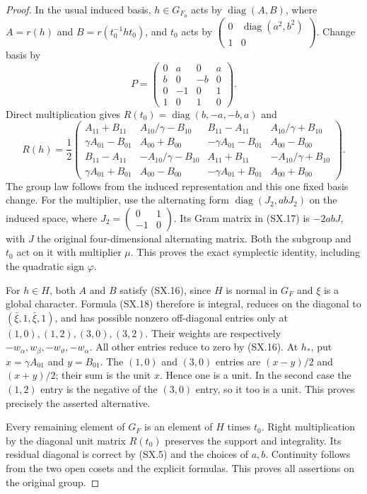 \begin{proof}
In the usual induced basis, $h\in G_{F_0}$ acts by
$\operatorname{diag}(A,B)$, where
$A=r(h)$ and $B=r(t_0^{-1}ht_0)$, and $t_0$ acts by
$\left(\begin{smallmatrix}0&\operatorname{diag}(a^2,b^2)\\1&0\end{smallmatrix}\right)$.
Change basis by
\[
 P=\begin{pmatrix}
 0&a&0&a\\ b&0&-b&0\\0&-1&0&1\\1&0&1&0
 \end{pmatrix}.
                                                            \tag{SX.17}
\]
Direct multiplication gives $R(t_0)=\operatorname{diag}(b,-a,-b,a)$
and
\[
R(h)=\frac12\begin{pmatrix}
A_{11}+B_{11}&A_{10}/\gamma-B_{10}&B_{11}-A_{11}&A_{10}/\gamma+B_{10}\\
\gamma A_{01}-B_{01}&A_{00}+B_{00}&-\gamma A_{01}-B_{01}&A_{00}-B_{00}\\
B_{11}-A_{11}&-A_{10}/\gamma-B_{10}&A_{11}+B_{11}&-A_{10}/\gamma+B_{10}\\
\gamma A_{01}+B_{01}&A_{00}-B_{00}&-\gamma A_{01}+B_{01}&A_{00}+B_{00}
\end{pmatrix}.                                                \tag{SX.18}
\]
The group law follows from the induced representation and this
one fixed basis change.  For the multiplier, use the alternating
form $\operatorname{diag}(J_2,abJ_2)$ on the induced space, where
$J_2=\left(\begin{smallmatrix}0&1\\-1&0\end{smallmatrix}\right)$.
Its Gram matrix in (SX.17) is $-2abJ$, with $J$ the original
four-dimensional alternating matrix.  Both the subgroup and
$t_0$ act on it with multiplier $\mu$.  This proves the exact
symplectic identity, including the quadratic sign $\varphi$.

For $h\in H$, both $A$ and $B$ satisfy (SX.16), since $H$ is
normal in $G_F$ and $\xi$ is a global character.  Formula (SX.18)
therefore is integral, reduces on the diagonal to
$(\bar\xi,1,\bar\xi,1)$, and has possible nonzero off-diagonal
entries only at $(1,0),(1,2),(3,0),(3,2)$.
Their weights are respectively
$-w_\alpha,w_\beta,-w_\vartheta,-w_\alpha$.
All other entries reduce to zero by (SX.16).
At $h_*$, put $x=\gamma A_{01}$ and $y=B_{01}$.
The $(1,0)$ and $(3,0)$ entries are $(x-y)/2$ and $(x+y)/2$;
their sum is the unit $x$.  Hence one is a unit.
In the second case the $(1,2)$ entry is the negative of the
$(3,0)$ entry, so it too is a unit.
This proves precisely the asserted alternative.

Every remaining element of $G_F$ is an element of $H$ times
$t_0$.  Right multiplication by the diagonal unit matrix
$R(t_0)$ preserves the support and integrality.  Its residual
diagonal is correct by (SX.5) and the choices of $a,b$.
Continuity follows from the two open cosets and the explicit
formulas.  This proves all assertions on the original group.
\end{proof}

